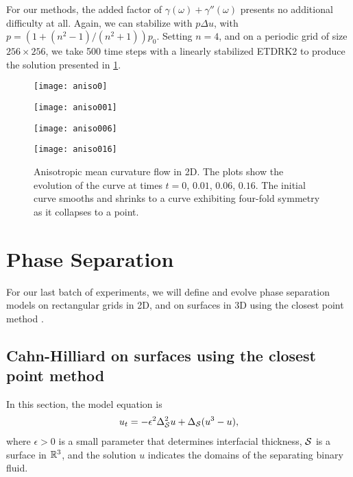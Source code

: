 For our methods, the added factor of $\gamma(\omega) + \gamma''(\omega)$ presents no additional difficulty at all. Again, we can stabilize with $p\Delta u$, with $p=(1+(n^2-1)/(n^2+1))p_0$. Setting $n=4$, and on a periodic grid of size $256\times 256$, we take 500 time steps with a linearly stabilized ETDRK2 to produce the solution presented in \cref{fig:aniso mcm}. 
\begin{figure}
        \centering
\begin{minipage}{0.44\textwidth}
       \texttt{[image: aniso0]}
\end{minipage}
\begin{minipage}{0.44\textwidth}
       \texttt{[image: aniso001]}
\end{minipage}
\begin{minipage}{0.44\textwidth}
       \texttt{[image: aniso006]}
\end{minipage}
\begin{minipage}{0.44\textwidth}
       \texttt{[image: aniso016]}
\end{minipage}
\caption[Anisotropic mean curvature flow]{Anisotropic mean curvature flow in 2D. The plots show the evolution of the curve at times $t=0$, $0.01$, $0.06$, $0.16$. The initial curve smooths and shrinks to a curve exhibiting four-fold symmetry as it collapses to a point.}
\label{fig:aniso mcm}
\end{figure}

\section{Phase Separation}
For our last batch of experiments, we will define and evolve phase separation models on rectangular grids in 2D, and on surfaces in 3D using the closest point method \cite{ruuth2008simple,macdonald2009implicit}.

\subsection{Cahn-Hilliard on surfaces using the closest point method}
In this section, the model equation is 
\begin{align}
u_t = -\epsilon^2 \Delta_\S^2 u + \Delta_\S(u^3- u),
\label{ch}
\end{align}
where $\epsilon>0$ is a small parameter that determines interfacial thickness, $\S$ is a surface in $\bR^3$, and the solution $u$ indicates the domains of the separating binary fluid.

